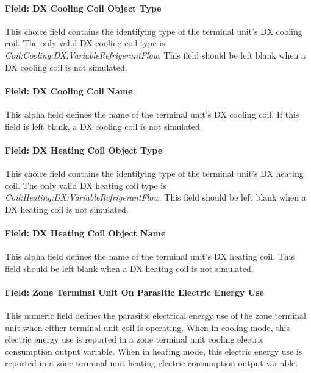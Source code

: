 \paragraph{Field: DX Cooling Coil Object Type}\label{field-dx-cooling-coil-object-type}

This choice field contains the identifying type of the terminal unit's DX cooling coil. The only valid DX cooling coil type is \textit{Coil:Cooling:DX:VariableRefrigerantFlow}. This field should be left blank when a DX cooling coil is not simulated.

\paragraph{Field: DX Cooling Coil Name}\label{field-dx-cooling-coil-name-1}

This alpha field defines the name of the terminal unit's DX cooling coil. If this field is left blank, a DX cooling coil is not simulated.

\paragraph{Field: DX Heating Coil Object Type}\label{field-dx-heating-coil-object-type}

This choice field contains the identifying type of the terminal unit's DX heating coil. The only valid DX heating coil type is \textit{Coil:Heating:DX:VariableRefrigerantFlow}. This field should be left blank when a DX heating coil is not simulated.

\paragraph{Field: DX Heating Coil Object Name}\label{field-dx-heating-coil-object-name}

This alpha field defines the name of the terminal unit's DX heating coil. This field should be left blank when a DX heating coil is not simulated.

\paragraph{Field: Zone Terminal Unit On Parasitic Electric Energy Use}\label{field-zone-terminal-unit-on-parasitic-electric-energy-use-000}

This numeric field defines the parasitic electrical energy use of the zone terminal unit when either terminal unit coil is operating. When in cooling mode, this electric energy use is reported in a zone terminal unit cooling electric consumption output variable. When in heating mode, this electric energy use is reported in a zone terminal unit heating electric consumption output variable.

